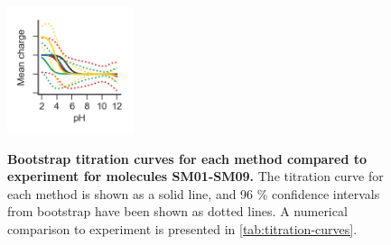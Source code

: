 \documentclass[9pt,lineno,final]{elife}
\begin{document}
\begin{figure}[H]
	\includegraphics[width=0.33\textwidth]{Reports/overview-virtual-titration-SM09.png}	 \\
	\caption{{\bf Bootstrap titration curves for each method compared to experiment for molecules SM01-SM09.} The titration curve for each method is shown as a solid line, and 96 \% confidence intervals from bootstrap have been shown as dotted lines. A numerical comparison to experiment is presented in \cref{tab:titration-curves}.
	\label{fig:charge-curves1}}
	\end{figure}
	
\end{document}
